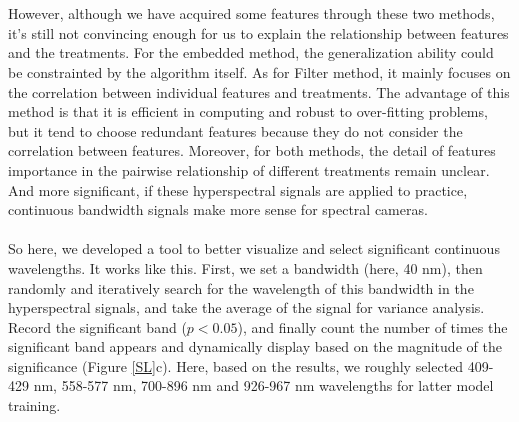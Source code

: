 \documentclass[12pt,a4paper]{article}
\begin{document}
\\
\\
However, although we have acquired some features through these two methods, it's still not convincing enough for us to explain the relationship between features and the treatments. For the embedded method, the generalization ability could be constrainted by the algorithm itself. As for Filter method, it mainly focuses on the correlation between individual features and treatments. The advantage of this method is that it is efficient in computing and robust to over-fitting problems, but it tend to choose redundant features because they do not consider the correlation between features. Moreover, for both methods, the detail of features importance in the pairwise relationship of different treatments remain unclear. And more significant, if these hyperspectral signals are applied to practice, continuous bandwidth signals make more sense for spectral cameras.
\\
\\
So here, we developed a tool to better visualize and select significant continuous wavelengths. It works like this. First, we set a bandwidth (here, 40 nm), then randomly and iteratively search for the wavelength of this bandwidth in the hyperspectral signals, and take the average of the signal for variance analysis. Record the significant band ($p < 0.05$), and finally count the number of times the significant band appears and dynamically display based on the magnitude of the significance (Figure \ref{SL}c). Here, based on the results, we roughly selected 409-429 nm, 558-577 nm, 700-896 nm and 926-967 nm wavelengths for latter model training.
\end{document}
